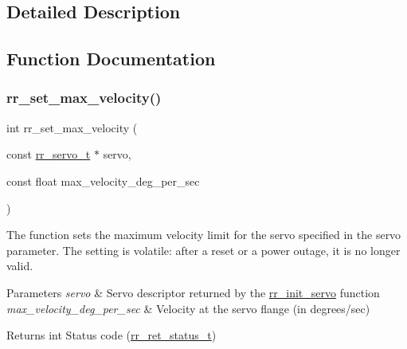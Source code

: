 \subsection{Detailed Description}


\subsection{Function Documentation}
\mbox{\label{group___servo__config_ga18d5d9dc728f7cb8e7674b9e9b275aca}} 
\subsubsection{\texorpdfstring{rr\+\_\+set\+\_\+max\+\_\+velocity()}{rr\_set\_max\_velocity()}}
{\footnotesize\ttfamily int rr\+\_\+set\+\_\+max\+\_\+velocity (\begin{DoxyParamCaption}\item[{const \hyperlink{structrr__servo__t}{rr\+\_\+servo\+\_\+t} $\ast$}]{servo,  }\item[{const float}]{max\+\_\+velocity\+\_\+deg\+\_\+per\+\_\+sec }\end{DoxyParamCaption})}



The function sets the maximum velocity limit for the servo specified in the \textquotesingle{}servo\textquotesingle{} parameter. The setting is volatile\+: after a reset or a power outage, it is no longer valid. 


\begin{DoxyParams}{Parameters}
{\em servo} & Servo descriptor returned by the \hyperlink{group___common_ga0adb313a3eeb8a4399431e940a1f3e9e}{rr\+\_\+init\+\_\+servo} function \\
\hline
{\em max\+\_\+velocity\+\_\+deg\+\_\+per\+\_\+sec} & Velocity at the servo flange (in degrees/sec) \\
\hline
\end{DoxyParams}
\begin{DoxyReturn}{Returns}
int Status code (\hyperlink{api_8h_a92d5be5038abcf89837faf85a08debdc}{rr\+\_\+ret\+\_\+status\+\_\+t}) 
\end{DoxyReturn}
\mbox{\label{group___servo__config_gab68e78b8a0d2a9ac38b9a72d78acab85}} 
